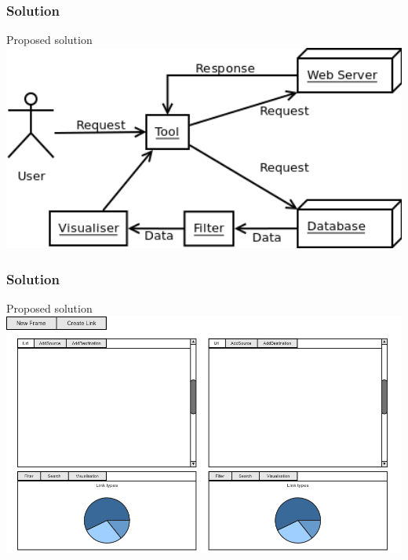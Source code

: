\begin{frame}
\frametitle{Solution}
	\begin{block}{Proposed solution}
			\includegraphics[width=1\textwidth]{./images/structure.png}
	\end{block}
\end{frame}
\begin{frame}
\frametitle{Solution}
	\begin{block}{Proposed solution}
		\includegraphics[width=1\textwidth]{./images/toolMockup.png}
	\end{block}
\end{frame}

